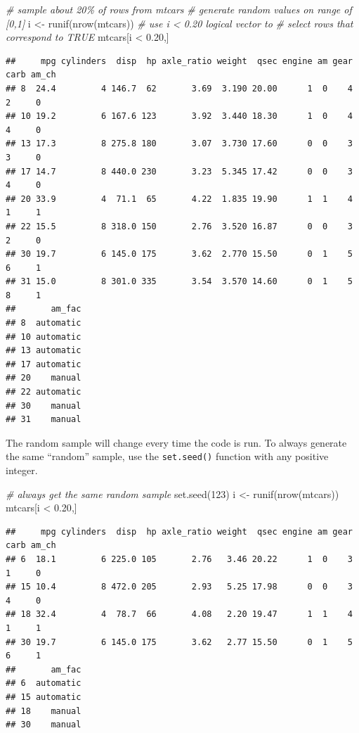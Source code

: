 \documentclass[
]{book}
\newenvironment{Shaded}{\begin{snugshade}}{\end{snugshade}}
\newcommand{\CommentTok}[1]{\textcolor[rgb]{0.56,0.35,0.01}{\textit{#1}}}
\newcommand{\DecValTok}[1]{\textcolor[rgb]{0.00,0.00,0.81}{#1}}
\newcommand{\FloatTok}[1]{\textcolor[rgb]{0.00,0.00,0.81}{#1}}
\newcommand{\FunctionTok}[1]{\textcolor[rgb]{0.00,0.00,0.00}{#1}}
\newcommand{\NormalTok}[1]{#1}
\newcommand{\OtherTok}[1]{\textcolor[rgb]{0.56,0.35,0.01}{#1}}
\newcommand{\SpecialCharTok}[1]{\textcolor[rgb]{0.00,0.00,0.00}{#1}}
\begin{document}
\begin{Shaded}
\begin{Highlighting}[]
\CommentTok{\# sample about 20\% of rows from mtcars}
\CommentTok{\# generate random values on range of [0,1]}
\NormalTok{i }\OtherTok{\textless{}{-}} \FunctionTok{runif}\NormalTok{(}\FunctionTok{nrow}\NormalTok{(mtcars))}
\CommentTok{\# use i \textless{} 0.20 logical vector to }
\CommentTok{\# select rows that correspond to TRUE}
\NormalTok{mtcars[i }\SpecialCharTok{\textless{}} \FloatTok{0.20}\NormalTok{,]}
\end{Highlighting}
\end{Shaded}

\begin{verbatim}
##     mpg cylinders  disp  hp axle_ratio weight  qsec engine am gear carb am_ch
## 8  24.4         4 146.7  62       3.69  3.190 20.00      1  0    4    2     0
## 10 19.2         6 167.6 123       3.92  3.440 18.30      1  0    4    4     0
## 13 17.3         8 275.8 180       3.07  3.730 17.60      0  0    3    3     0
## 17 14.7         8 440.0 230       3.23  5.345 17.42      0  0    3    4     0
## 20 33.9         4  71.1  65       4.22  1.835 19.90      1  1    4    1     1
## 22 15.5         8 318.0 150       2.76  3.520 16.87      0  0    3    2     0
## 30 19.7         6 145.0 175       3.62  2.770 15.50      0  1    5    6     1
## 31 15.0         8 301.0 335       3.54  3.570 14.60      0  1    5    8     1
##       am_fac
## 8  automatic
## 10 automatic
## 13 automatic
## 17 automatic
## 20    manual
## 22 automatic
## 30    manual
## 31    manual
\end{verbatim}

The random sample will change every time the code is run. To always generate the same ``random'' sample, use the \texttt{set.seed()} function with any positive integer.

\begin{Shaded}
\begin{Highlighting}[]
\CommentTok{\# always get the same random sample}
\FunctionTok{set.seed}\NormalTok{(}\DecValTok{123}\NormalTok{)}
\NormalTok{i }\OtherTok{\textless{}{-}} \FunctionTok{runif}\NormalTok{(}\FunctionTok{nrow}\NormalTok{(mtcars))}
\NormalTok{mtcars[i }\SpecialCharTok{\textless{}} \FloatTok{0.20}\NormalTok{,]}
\end{Highlighting}
\end{Shaded}

\begin{verbatim}
##     mpg cylinders  disp  hp axle_ratio weight  qsec engine am gear carb am_ch
## 6  18.1         6 225.0 105       2.76   3.46 20.22      1  0    3    1     0
## 15 10.4         8 472.0 205       2.93   5.25 17.98      0  0    3    4     0
## 18 32.4         4  78.7  66       4.08   2.20 19.47      1  1    4    1     1
## 30 19.7         6 145.0 175       3.62   2.77 15.50      0  1    5    6     1
##       am_fac
## 6  automatic
## 15 automatic
## 18    manual
## 30    manual
\end{verbatim}
\end{document}
